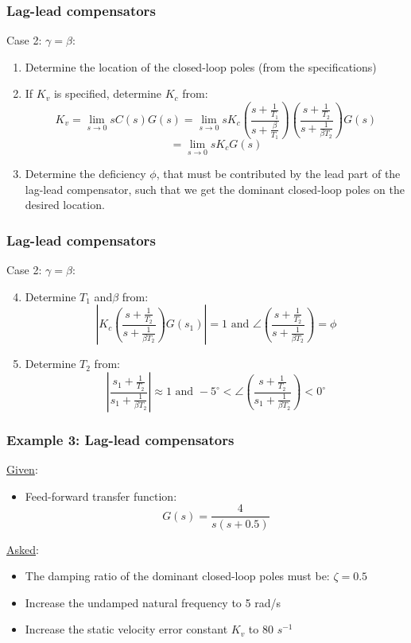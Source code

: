\begin{frame}
	\frametitle{Lag-lead compensators}
	Case 2: $\gamma= \beta$:
	\begin{enumerate}
		\item Determine the location of the closed-loop poles (from the specifications)
		\item If $K_v$ is specified, determine $K_c$ from:\\
		$$K_v=\lim_{s \to 0} sC(s)G(s)=\lim_{s\to 0}sK_c(\frac{s+\frac{1}{T_1}}{s+\frac{\beta}{T_1}})
		(\frac{s+\frac{1}{T_2}}{s+\frac{1}{\beta T_2}})G(s)$$
		$$=\lim_{s\to0}sK_cG(s)$$\item Determine the deficiency $\phi$, that must be contributed by the lead part of the lag-lead compensator, such that we get the dominant closed-loop poles on the desired location. 
	\end{enumerate}
\end{frame}

\begin{frame}
	\frametitle{Lag-lead compensators}
	Case 2: $\gamma= \beta$:
	\begin{enumerate}
		\setcounter{enumi}{3}
		\item Determine $T_1$ and$\beta$ from:
		$$|K_c(\frac{s+\frac{1}{T_2}}{s+\frac{1}{\beta T_2}})G(s_1)|=1 \text{ and } \angle(\frac{s+\frac{1}{T_2}}{s+\frac{1}{\beta T_2}})=\phi$$
		\item Determine $T_2$ from:\\
		$$|\frac{s_1+\frac{1}{T_2}}{s_1+\frac{1}{\beta T_2}}|\approx 1 \text{ and } -5^{\circ}<\angle(\frac{s+\frac{1}{T_2}}{s_1+\frac{1}{\beta T_2}})<0^{\circ}$$
	\end{enumerate}
\end{frame}

\begin{frame}
	\frametitle{Example 3: Lag-lead compensators}
	\underline{Given}:
	\begin{itemize}
		\item Feed-forward transfer function: $$G(s)=\frac{4}{s(s+0.5)}$$
	\end{itemize}
	\underline{Asked}:
	\begin{itemize}
		\item The damping ratio of the dominant closed-loop poles must be: $\zeta=0.5$
		\item Increase the undamped natural frequency to 5 rad/s
		\item Increase the static velocity error constant $K_v$ to 80 $s^{-1}$
	\end{itemize}
\end{frame}

